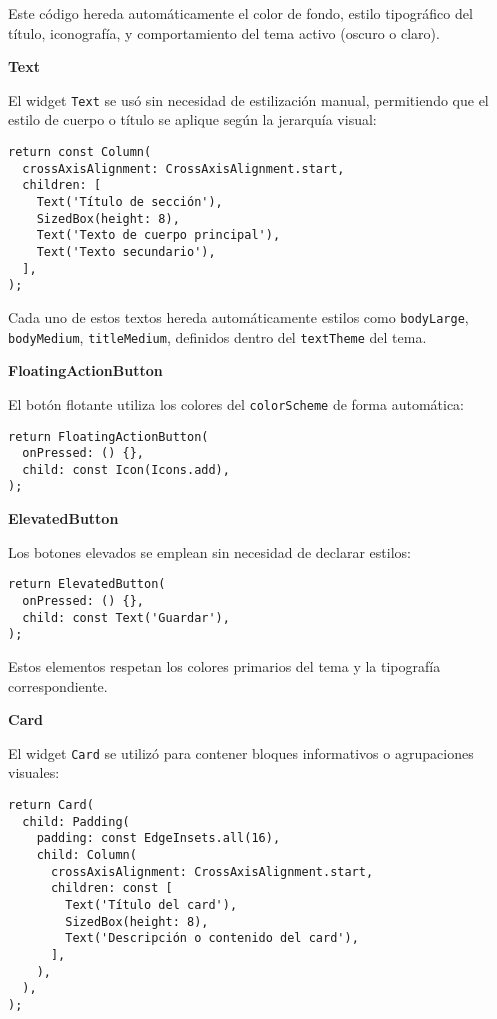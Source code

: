Este código hereda automáticamente el color de fondo, estilo tipográfico del título, iconografía, y comportamiento del tema activo (oscuro o claro).

\textbf{Text}

El widget \texttt{Text} se usó sin necesidad de estilización manual, permitiendo que el estilo de cuerpo o título se aplique según la jerarquía visual:

\begin{verbatim}
return const Column(
  crossAxisAlignment: CrossAxisAlignment.start,
  children: [
    Text('Título de sección'),
    SizedBox(height: 8),
    Text('Texto de cuerpo principal'),
    Text('Texto secundario'),
  ],
);
\end{verbatim}

Cada uno de estos textos hereda automáticamente estilos como \texttt{bodyLarge}, \texttt{bodyMedium}, \texttt{titleMedium}, definidos dentro del \texttt{textTheme} del tema.

\textbf{FloatingActionButton}

El botón flotante utiliza los colores del \texttt{colorScheme} de forma automática:

\begin{verbatim}
return FloatingActionButton(
  onPressed: () {},
  child: const Icon(Icons.add),
);
\end{verbatim}

\textbf{ElevatedButton}

Los botones elevados se emplean sin necesidad de declarar estilos:

\begin{verbatim}
return ElevatedButton(
  onPressed: () {},
  child: const Text('Guardar'),
);
\end{verbatim}

Estos elementos respetan los colores primarios del tema y la tipografía correspondiente.

\textbf{Card}

El widget \texttt{Card} se utilizó para contener bloques informativos o agrupaciones visuales:

\begin{verbatim}
return Card(
  child: Padding(
    padding: const EdgeInsets.all(16),
    child: Column(
      crossAxisAlignment: CrossAxisAlignment.start,
      children: const [
        Text('Título del card'),
        SizedBox(height: 8),
        Text('Descripción o contenido del card'),
      ],
    ),
  ),
);
\end{verbatim}

